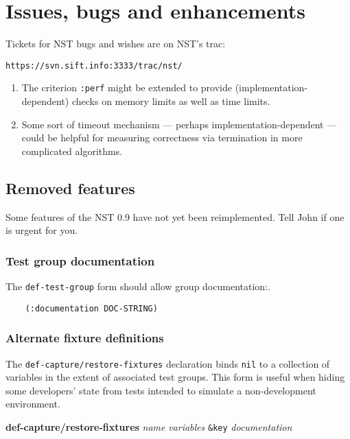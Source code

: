 
\section{Issues, bugs and enhancements}
Tickets for NST bugs and wishes are on NST's trac:
\begin{center}
  \texttt{https://svn.sift.info:3333/trac/nst/}
\end{center}

\begin{enumerate}
\item The criterion \texttt{:perf} might be extended to provide
  (implementation-dependent) checks on memory limits as well as time
  limits.
\item Some sort of timeout mechanism --- perhaps
  implementation-dependent --- could be helpful for measuring
  correctness via termination in more complicated algorithms.
\end{enumerate}

\subsection{Removed features}
\label{temp-removed}
Some features of the NST 0.9 have not yet been reimplemented.  Tell
John if one is urgent for you.

\subsubsection{Test group documentation}
The \texttt{def-test-group} form should allow group
documentation:.
\begin{verbatim}
    (:documentation DOC-STRING)
\end{verbatim}

\subsubsection{Alternate fixture definitions}
The
\texttt{def-capture/restore-fixtures}
declaration binds \texttt{nil} to a collection of variables in the
extent of associated test groups.  This form is useful when hiding
some developers' state from tests intended to simulate a
non-development environment.
\begin{center}
\textbf{def-capture/restore-fixtures}
 \textit{name} \textit{variables}
\texttt{\&key} \textit{documentation}
\end{center}

